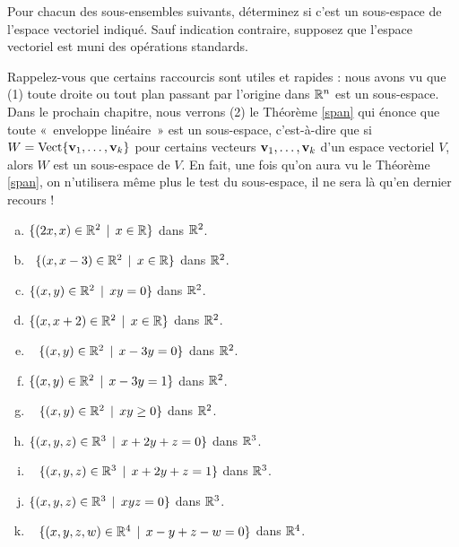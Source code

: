 
  
 \begin{prob} \label{prob05.1} Pour chacun des sous-ensembles suivants, déterminez si c'est un sous-espace de l'espace vectoriel indiqué. Sauf indication contraire, supposez que l'espace vectoriel est muni des opérations standards. 

Rappelez-vous que certains raccourcis sont utiles et rapides : nous avons vu que (1) toute droite ou tout plan passant par l'origine dans $\mathbb{R}^n$ est un sous-espace. Dans le prochain chapitre, nous verrons (2) le Théorème \ref{span}  qui \'enonce que toute «~enveloppe lin\'eaire~»  est un sous-espace, c'est-à-dire que si $W=\operatorname{ Vect} \normalsize\{\mathbf{v}_1, \dots, \mathbf{v}_k\normalsize\}$ pour certains vecteurs $\mathbf{v}_1, \dots, \mathbf{v}_k $ d'un espace vectoriel $V$, alors $W$ est un sous-espace de $V$. En fait, une fois qu'on aura vu le Théorème \ref{span}, on n'utilisera même plus le test du sous-espace, il ne sera là qu'en dernier recours !

\medskip
\begin{enumerate}[a)]
\item  $\{(2x, x) \in \mathbb{R}^2\, \mid \, x\in \mathbb{R}\}$ dans $\mathbb{R}^2$.\medskip
\item\sov~$\{(x, x-3) \in \mathbb{R}^2\, \mid \, x\in \mathbb{R}\}$ dans $\mathbb{R}^2$.
\medskip
\item $\{(x, y) \in \mathbb{R}^2\, \mid \, xy=0\}$ dans $\mathbb{R}^2$.
\medskip
 
\item  $\{(x, x+2) \in \mathbb{R}^2\, \mid \, x\in \mathbb{R}\}$ dans  $\mathbb{R}^2$. \medskip

\item\sov~ $\{(x, y) \in \mathbb{R}^2\, \mid \, x -3y=0 \}$ dans   $\mathbb{R}^2$. \medskip

\item $\{(x, y) \in \mathbb{R}^2\, \mid \, x -3y=1 \}$ dans   $\mathbb{R}^2$.\medskip

\item\sov~ $\{(x, y) \in \mathbb{R}^2\, \mid \, xy \ge 0 \}$ dans     $\mathbb{R}^2$.\medskip
 
\item  $\{(x, y, z) \in \mathbb{R}^3\, \mid \, x+2y+z=0 \}$ dans    $\mathbb{R}^3$.\medskip \medskip

\item\sov~ $\{(x, y, z) \in \mathbb{R}^3\, \mid \, x+2y+z=1 \}$ dans   $\mathbb{R}^3$.\medskip 

\item $\{(x, y,z) \in \mathbb{R}^3\, \mid \, xyz=0\}$ dans $\mathbb{R}^3$.
\medskip

\item\sov~ $\{(x, y, z, w) \in \mathbb{R}^4\, \mid \, x-y+z-w=0 \}$ dans $\mathbb{R}^4$.  \medskip


\end{enumerate}
\end{prob}

